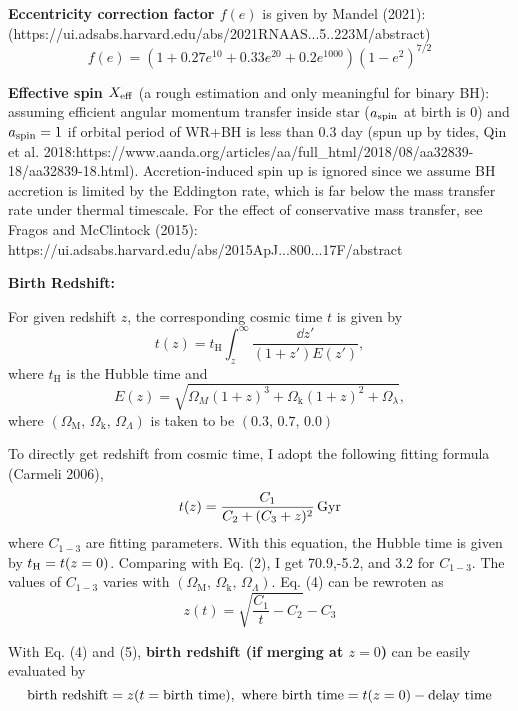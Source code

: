 \documentclass{article}
\begin{document}
\textbf{\Large Eccentricity correction factor $f(e)$} is given by Mandel (2021): 
\newline(https://ui.adsabs.harvard.edu/abs/2021RNAAS...5..223M/abstract)
\begin{equation}
	f(e) = (1+0.27 e^{10}+0.33 e^{20} + 0.2 e^{1000})(1-e^2)^{7/2}
\end{equation}

\textbf{\Large Effective spin $X_{\rm eff}$} (a rough estimation and only meaningful for binary BH): assuming efficient angular momentum transfer inside star ($a_{\rm spin}$ at birth is 0) and $a_{\rm spin}=1$ if orbital period of WR+BH is less than 0.3 day (spun up by tides, Qin et al. 2018:\newline https://www.aanda.org/articles/aa/full\_html/2018/08/aa32839-18/aa32839-18.html). Accretion-induced spin up is ignored since we assume BH accretion is limited by the Eddington rate, which is far below the mass transfer rate under thermal timescale. For the effect of conservative mass transfer, see Fragos and McClintock (2015): https://ui.adsabs.harvard.edu/abs/2015ApJ...800...17F/abstract\newline


\textbf{Birth Redshift:}\newline
\begin{minipage}{0.5\linewidth}
For given redshift $z$, the corresponding cosmic time $t$ is given by
\begin{equation}
    t(z) = t_\mathrm{H}\int_z^\infty\frac{\dd z'}{(1+z')E(z')},
    \label{t_H}
\end{equation}
where $t_\mathrm{H}$ is the Hubble time and
\begin{equation}
    E(z) = \sqrt{\Omega_M(1+z)^3+\Omega_\mathrm{k}(1+z)^2+\Omega_\lambda},
\end{equation}
where $(\Omega_\mathrm{M},\,\Omega_\mathrm{k},\,\Omega_\Lambda)$ is taken to be $(0.3,\,0.7,\,0.0)$
\end{minipage}
\begin{minipage}{0.5\linewidth}
	To directly get redshift from cosmic time, I adopt the following fitting formula (Carmeli 2006),
\begin{equation}
	t(z)=\frac{C_1}{C_2+(C_3+z)^2} {\,\rm Gyr}
    \label{z_fitting}
\end{equation}
	where $C_{1-3}$ are fitting parameters. With this equation, the Hubble time is given by $t_{\rm H}=t(z=0)$.  Comparing with Eq. (2), I get 70.9,-5.2, and 3.2 for $C_{1-3}$. The values of $C_{1-3}$ varies with  $(\Omega_\mathrm{M},\,\Omega_\mathrm{k},\,\Omega_\Lambda)$. Eq. (4) can be rewroten as
	\begin{equation}
		z(t)=\sqrt{\frac{C_1}{t}-C_2} - C_3
	\end{equation}

\end{minipage}\newline

With Eq. (4) and (5), \textbf{birth redshift (if merging at $z=0$)} can be easily evaluated by
\begin{equation}
	{\rm birth~redshift}=z(t={\rm birth~time})
	{\rm ,~where~birth~time}=t(z=0) - {\rm delay~time}
\end{equation}
\end{document}
